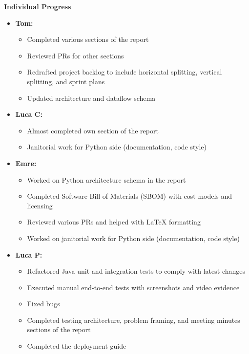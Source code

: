\documentclass[11pt]{article}
\begin{document}
    \textbf{Individual Progress}
    \begin{itemize}
        \item \textbf{Tom:}
        \begin{itemize}
            \item Completed various sections of the report
            \item Reviewed PRs for other sections
            \item Redrafted project backlog to include horizontal splitting, vertical splitting, and sprint plans
            \item Updated architecture and dataflow schema
        \end{itemize}

        \item \textbf{Luca C:}
        \begin{itemize}
            \item Almost completed own section of the report
            \item Janitorial work for Python side (documentation, code style)
        \end{itemize}

        \item \textbf{Emre:}
        \begin{itemize}
            \item Worked on Python architecture schema in the report
            \item Completed Software Bill of Materials (SBOM) with cost models and licensing
            \item Reviewed various PRs and helped with LaTeX formatting
            \item Worked on janitorial work for Python side (documentation, code style)
        \end{itemize}

        \item \textbf{Luca P:}
        \begin{itemize}
            \item Refactored Java unit and integration tests to comply with latest changes
            \item Executed manual end-to-end tests with screenshots and video evidence
            \item Fixed bugs
            \item Completed testing architecture, problem framing, and meeting minutes sections of the report
            \item Completed the deployment guide
        \end{itemize}


\end{itemize}
\end{document}
